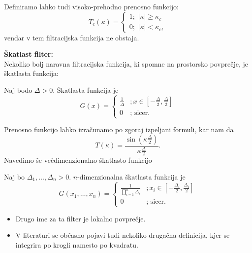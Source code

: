 \documentclass[mat2, tisk]{fmfdelo}
\begin{document}
\begin{opomba}
Definiramo lahko tudi visoko-prehodno prenosno funkcijo:
$$
T_c(\kappa)=\left\{\begin{array}{l}
  1 ;\,\, |\kappa| \geq \kappa_c \\
  0 ;\,\, |\kappa| < \kappa_c,
\end{array}\right.
$$
vendar v tem filtracijska funkcija ne obstaja.
\end{opomba}


\noindent
\textbf{Škatlast filter:}\\
Nekoliko bolj naravna filtracijska funkcija, ki spomne na prostorsko povprečje, je 
škatlasta funkcija:
\begin{definicija}
Naj bodo $\Delta > 0$. Škatlasta funkcija je 
\begin{equation}
G(x)= \begin{cases}\frac{1}{\Delta} & ; x \in\left[-\frac{\Delta}{2}, \frac{\Delta}{2}\right] \\ 0 & ; \text { sicer. }\end{cases}
\end{equation}
\end{definicija}

Prenosno funkcijo lahko izračunamo po zgoraj izpeljani formuli, kar nam da 
$$
T(\kappa) = \frac{\sin(\kappa \frac{\Delta}{2})}{\kappa \frac{\Delta}{2}}.
$$
Navedimo še večdimenzionalno škatlasto funkcijo
\begin{definicija}
Naj bo $\Delta_1, \dots, \Delta_n > 0$. $n$-dimenzionalna
škatlasta funkcija je 
\begin{equation}
  G(x_1, \dots, x_n)= \begin{cases}\frac{1}{\prod_{i=1}^{n}\Delta_i} & ; x_i \in\left[-\frac{\Delta_i}{2}, \frac{\Delta_i}{2}\right] \\ 0 & ; \text { sicer. }\end{cases}
\end{equation}  
\end{definicija}

\begin{opomba}
  \hfill
  \begin{itemize}
    \item Drugo ime za ta filter je lokalno povprečje.
    \item V literaturi se občasno pojavi tudi nekoliko drugačna definicija, kjer 
    se integrira po krogli namesto po kvadratu.
  \end{itemize}
  \end{opomba}
  
\end{document}

